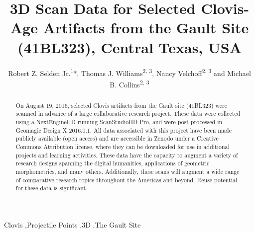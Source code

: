 \documentclass[preprint,12pt]{elsarticle}
\begin{document}
\begin{frontmatter}


\title{3D Scan Data for Selected Clovis-Age Artifacts from the Gault Site (41BL323), Central Texas, USA}



\author{Robert Z. Selden Jr.\textsuperscript{1}*, Thomas J. Williams\textsuperscript{2, 3}, Nancy Velchoff\textsuperscript{2, 3} and Michael B. Collins\textsuperscript{2, 3}} %
\address{\textsuperscript{1}\textit{Heritage Research Center, Stephen F. Austin State University, USA}} %
\address{\textsuperscript{3}\textit{Prehistory Research Project, Department of Anthropology, Texas State University, USA}}%
\address{\textsuperscript{4}\textit{Gault School of Archaeological Research, San Marcos, Texas, USA}}

\begin{abstract}
On August 19, 2016, selected Clovis artifacts from the Gault site (41BL323) were scanned in advance of a large collaborative research project. These data were collected using a NextEngineHD running ScanStudioHD Pro, and were post-processed in Geomagic Design X 2016.0.1. All data associated with this project have been made publicly available (open access) and are accessible in Zenodo under a Creative Commons Attribution license, where they can be downloaded for use in additional projects and learning activities. These data have the capacity to augment a variety of research designs spanning the digital humanities, applications of geometric morphometrics, and many others. Additionally, these scans will augment a wide range of comparative research topics throughout the Americas and beyond. Reuse potential for these data is significant.
\end{abstract}

\begin{keyword}
Clovis \sep Projectile Points \sep 3D \sep The Gault Site


\end{keyword}

\end{frontmatter}
\end{document}
